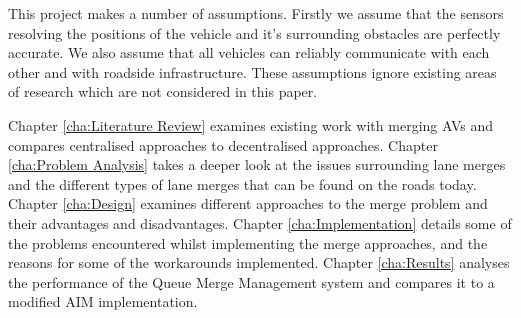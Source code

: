 This project makes a number of assumptions. Firstly we assume that the sensors resolving the positions of the vehicle and it's surrounding obstacles are perfectly accurate. We also assume that all vehicles can reliably communicate with each other and with roadside infrastructure. These assumptions ignore existing areas of research which are not considered in this paper.

Chapter \ref{cha:Literature Review} examines existing work with merging AVs and compares centralised approaches to decentralised approaches. Chapter \ref{cha:Problem Analysis} takes a deeper look at the issues surrounding lane merges and the different types of lane merges that can be found on the roads today. Chapter \ref{cha:Design} examines different approaches to the merge problem and their advantages and disadvantages. Chapter \ref{cha:Implementation} details some of the problems encountered whilst implementing the merge approaches, and the reasons for some of the workarounds implemented. Chapter \ref{cha:Results} analyses the performance of the Queue Merge Management system and compares it to a modified AIM implementation.